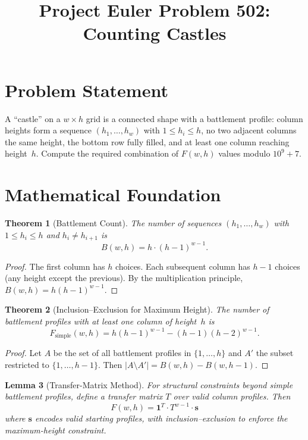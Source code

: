 \documentclass[12pt]{article}
\title{Project Euler Problem 502: Counting Castles}
\author{}
\date{}
\newtheorem{theorem}{Theorem}
\newtheorem{lemma}[theorem]{Lemma}
\begin{document}
\maketitle

\section{Problem Statement}
A ``castle'' on a $w \times h$ grid is a connected shape with a battlement profile: column heights form a sequence $(h_1, \ldots, h_w)$ with $1 \le h_i \le h$, no two adjacent columns the same height, the bottom row fully filled, and at least one column reaching height~$h$. Compute the required combination of $F(w,h)$ values modulo $10^9 + 7$.

\section{Mathematical Foundation}

\begin{theorem}[Battlement Count]
The number of sequences $(h_1, \ldots, h_w)$ with $1 \le h_i \le h$ and $h_i \ne h_{i+1}$ is
\[
B(w, h) = h \cdot (h-1)^{w-1}.
\]
\end{theorem}

\begin{proof}
The first column has $h$ choices. Each subsequent column has $h - 1$ choices (any height except the previous). By the multiplication principle, $B(w,h) = h(h-1)^{w-1}$.
\end{proof}

\begin{theorem}[Inclusion--Exclusion for Maximum Height]
The number of battlement profiles with at least one column of height~$h$ is
\[
F_{\mathrm{simple}}(w, h) = h(h-1)^{w-1} - (h-1)(h-2)^{w-1}.
\]
\end{theorem}

\begin{proof}
Let $A$ be the set of all battlement profiles in $\{1,\ldots,h\}$ and $A'$ the subset restricted to $\{1,\ldots,h-1\}$. Then $|A \setminus A'| = B(w,h) - B(w,h-1)$.
\end{proof}

\begin{lemma}[Transfer-Matrix Method]
For structural constraints beyond simple battlement profiles, define a transfer matrix $T$ over valid column profiles. Then
\[
F(w, h) = \mathbf{1}^T \cdot T^{w-1} \cdot \mathbf{s}
\]
where $\mathbf{s}$ encodes valid starting profiles, with inclusion--exclusion to enforce the maximum-height constraint.
\end{lemma}
\end{document}
